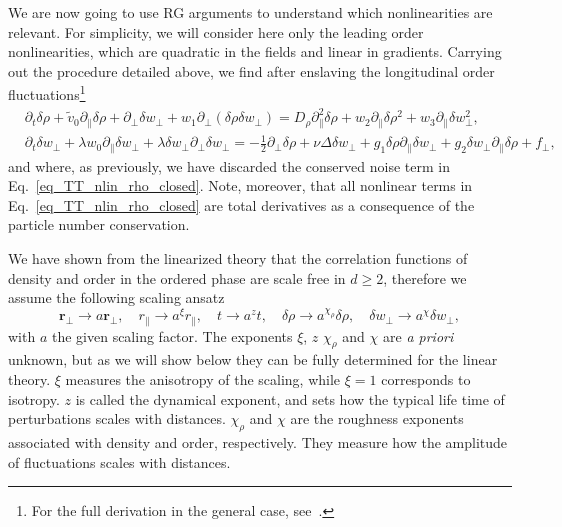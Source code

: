 We are now going to use RG arguments to understand which nonlinearities are relevant. For simplicity, we will consider here only the leading order nonlinearities, which are quadratic in the fields and linear in gradients. 
Carrying out the procedure detailed above, we find after enslaving the longitudinal order fluctuations\footnote{For the full derivation in the general case, see~\cite{toner2012reanalysis}.}
\begin{subequations}
\label{eq_TT_nlin_closed}
\begin{align}
\label{eq_TT_nlin_rho_closed}
&\partial_t \delta \rho + \tilde{v}_0\partial_\| \delta \rho + \partial_\perp \delta w_\perp + w_1 \partial_\perp( \delta \rho \delta w_\perp ) = 
D_\rho \partial_\|^2 \delta\rho + w_2\partial_\|  \delta \rho^2 + w_3 \partial_\|  \delta w_\perp^2 , \\
\label{eq_TT_nlin_perp_closed}
&\partial_t \delta w_\perp + \lambda w_0  \partial_\| \delta w_\perp + \lambda\delta w_\perp  \partial_\perp \delta w_\perp =  
- \frac{1}{2}\partial_\perp \delta \rho + \nu \Delta \delta w_\perp + g_1 \delta \rho \partial_\|  \delta w_\perp + g_2\delta w_\perp\partial_\|\delta \rho  + f_\perp,
\end{align}
\end{subequations}
and where, as previously, we have discarded the conserved noise term in Eq.~\eqref{eq_TT_nlin_rho_closed}.
Note, moreover, that all nonlinear terms in Eq.~\eqref{eq_TT_nlin_rho_closed} are total derivatives as a consequence of the particle number conservation.

We have shown from the linearized theory that the correlation functions of density and order in the ordered phase are scale free in $d\ge 2$,
therefore 
we assume the following scaling ansatz
\begin{equation} \label{eq_rescaling}
\bm r_\perp \to a \bm r_\perp , \quad r_\| \to a^\xi r_\| , \quad t \to a^z t , \quad \delta\rho \to a^{\chi_\rho}\delta\rho , \quad \delta w_\perp \to a^{\chi}\delta w_\perp ,
\end{equation}
with $a$ the given scaling factor.
The exponents $\xi$, $z$ $\chi_\rho$ and $\chi$ are {\it a priori} unknown, but as we will show below they can be fully determined for the linear theory.
$\xi$ measures the anisotropy of the scaling, while $\xi = 1$ corresponds to isotropy.
$z$ is called the dynamical exponent, and sets how the typical life time of perturbations scales with distances. 
$\chi_\rho$ and $\chi$ are the roughness exponents associated with density and order, respectively. 
They measure how the amplitude of fluctuations scales with distances. 

